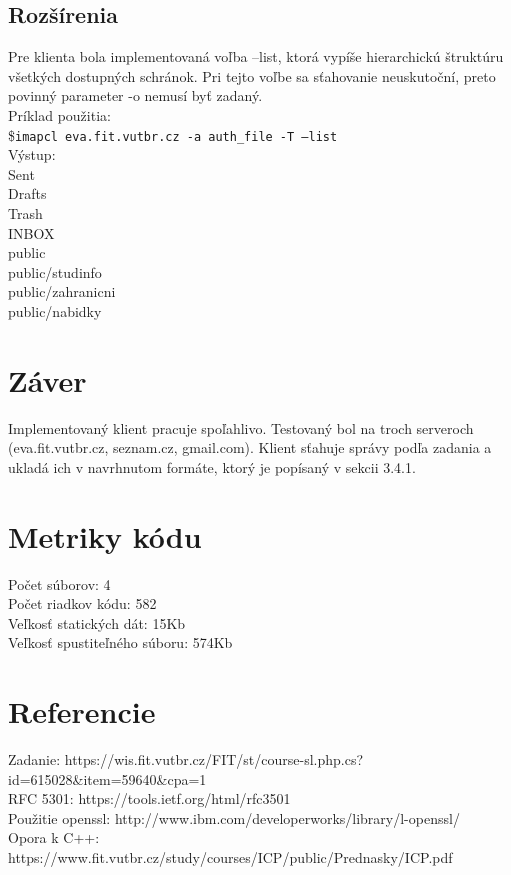 \documentclass{article}
\newcommand\tab[1][1cm]{\hspace*{#1}}
\begin{document}
\subsection{Rozšírenia}
Pre klienta bola implementovaná voľba --list, ktorá vypíše hierarchickú štruktúru všetkých dostupných schránok. Pri tejto voľbe sa sťahovanie neuskutoční, preto povinný parameter -o nemusí byť zadaný.\\
Príklad použitia:\\
\$\texttt{imapcl eva.fit.vutbr.cz -a auth\_file -T --list}\\
Výstup:\\
Sent\\
Drafts\\
Trash\\
INBOX\\
public\\
    \tab public/studinfo\\
    \tab public/zahranicni\\
    \tab public/nabidky\\


\section{Záver}
Implementovaný klient pracuje spoľahlivo. Testovaný bol na troch serveroch (eva.fit.vutbr.cz, seznam.cz, gmail.com). Klient sťahuje správy podľa zadania a ukladá ich v navrhnutom formáte, ktorý je popísaný v sekcii 3.4.1.
\section{Metriky kódu}
Počet súborov:      4\\
Počet riadkov kódu: 582\\
Veľkosť statických dát: 15Kb\\
Veľkosť spustiteľného súboru:  574Kb\\

\section{Referencie}
Zadanie: https://wis.fit.vutbr.cz/FIT/st/course-sl.php.cs?id=615028\&item=59640\&cpa=1\\
RFC 5301: https://tools.ietf.org/html/rfc3501\\
Použitie openssl: http://www.ibm.com/developerworks/library/l-openssl/\\
Opora k C++: https://www.fit.vutbr.cz/study/courses/ICP/public/Prednasky/ICP.pdf\\
\end{document}
